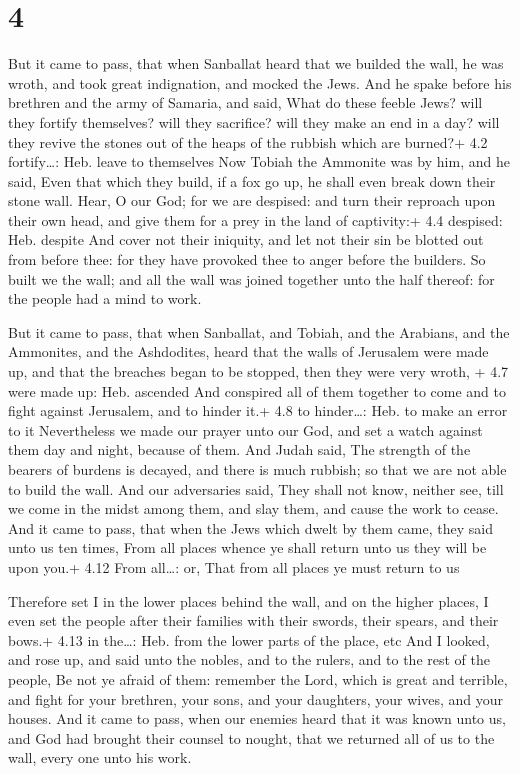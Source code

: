 \hypertarget{section-3}{%
\section{4}\label{section-3}}

 But it came to pass, that when Sanballat heard that we
builded the wall, he was wroth, and took great indignation, and mocked
the Jews.  And he spake before his brethren and the army of
Samaria, and said, What do these feeble Jews? will they fortify
themselves? will they sacrifice? will they make an end in a day? will
they revive the stones out of the heaps of the rubbish which are
burned?+ 4.2 fortify\ldots: Heb. leave to themselves  Now
Tobiah the Ammonite was by him, and he said, Even that which they build,
if a fox go up, he shall even break down their stone wall. 
Hear, O our God; for we are despised: and turn their reproach upon their
own head, and give them for a prey in the land of captivity:+ 4.4
despised: Heb. despite  And cover not their iniquity, and
let not their sin be blotted out from before thee: for they have
provoked thee to anger before the builders.  So built we the
wall; and all the wall was joined together unto the half thereof: for
the people had a mind to work.

 But it came to pass, that when Sanballat, and Tobiah, and
the Arabians, and the Ammonites, and the Ashdodites, heard that the
walls of Jerusalem were made up, and that the breaches began to be
stopped, then they were very wroth, + 4.7 were made up: Heb. ascended
 And conspired all of them together to come and to fight
against Jerusalem, and to hinder it.+ 4.8 to hinder\ldots: Heb. to make
an error to it  Nevertheless we made our prayer unto our
God, and set a watch against them day and night, because of them.
 And Judah said, The strength of the bearers of burdens is
decayed, and there is much rubbish; so that we are not able to build the
wall.  And our adversaries said, They shall not know,
neither see, till we come in the midst among them, and slay them, and
cause the work to cease.  And it came to pass, that when
the Jews which dwelt by them came, they said unto us ten times, From all
places whence ye shall return unto us they will be upon you.+ 4.12 From
all\ldots: or, That from all places ye must return to us

 Therefore set I in the lower places behind the wall, and
on the higher places, I even set the people after their families with
their swords, their spears, and their bows.+ 4.13 in the\ldots: Heb.
from the lower parts of the place, etc  And I looked, and
rose up, and said unto the nobles, and to the rulers, and to the rest of
the people, Be not ye afraid of them: remember the Lord, which is great
and terrible, and fight for your brethren, your sons, and your
daughters, your wives, and your houses.  And it came to
pass, when our enemies heard that it was known unto us, and God had
brought their counsel to nought, that we returned all of us to the wall,
every one unto his work.

